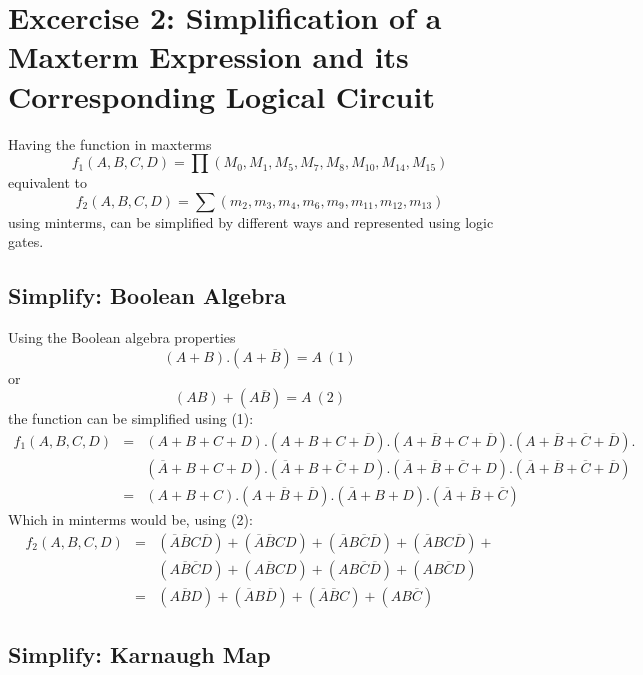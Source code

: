 \section{\color{olive}Excercise 2: Simplification of a Maxterm Expression and its Corresponding Logical Circuit}

Having the function in maxterms $$f_1 (A,B,C,D) = \prod\left(M_0, M_1 , M_5 , M_7 , M_8 , M_{10} , M_{14} , M_{15} \right)$$ equivalent to $$f_2 (A,B,C,D) = \sum\left(m_2, m_3 , m_4 , m_6 , m_9 , m_{11} , m_{12} , m_{13} \right)$$ using minterms, can be simplified by different ways and represented using logic gates.

    \subsection{\color{purple}Simplify: Boolean Algebra}

    Using the Boolean algebra properties $$(A+B).(A+\overline{B})=A~(1)$$ or $$(AB)+(A\overline{B})=A~(2)$$ the function can be simplified using (1):
    \begin{eqnarray*}
        f_1 (A,B,C,D) &= &(A+B+C+D).(A+B+C+\overline{D}).(A+\overline{B}+C+\overline{D}).(A+\overline{B}+\overline{C}+\overline{D}).\\
        &&(\overline{A}+B+C+D).(\overline{A}+B+\overline{C}+D).(\overline{A}+\overline{B}+\overline{C}+D).(\overline{A}+\overline{B}+\overline{C}+\overline{D}) \\
        &=&(A+B+C).(A+\overline{B}+\overline{D}).(\overline{A}+B+D).(\overline{A}+\overline{B}+\overline{C})
    \end{eqnarray*}
    Which in minterms would be, using (2):
    \begin{eqnarray*}
        f_2(A,B,C,D) &= &(\overline{A}\overline{B}C\overline{D})+(\overline{A}\overline{B}CD)+(\overline{A}B\overline{C}\overline{D})+(\overline{A}BC\overline{D})+\\
        &&(A\overline{B}\overline{C}D)+(A\overline{B}CD)+(AB\overline{C}\overline{D})+(AB\overline{C}D)\\
        &=&(A\overline{B}D)+(\overline{A}B\overline{D})+(\overline{A}\overline{B}C)+(AB\overline{C})
    \end{eqnarray*}

    \subsection{\color{purple}Simplify: Karnaugh Map}

